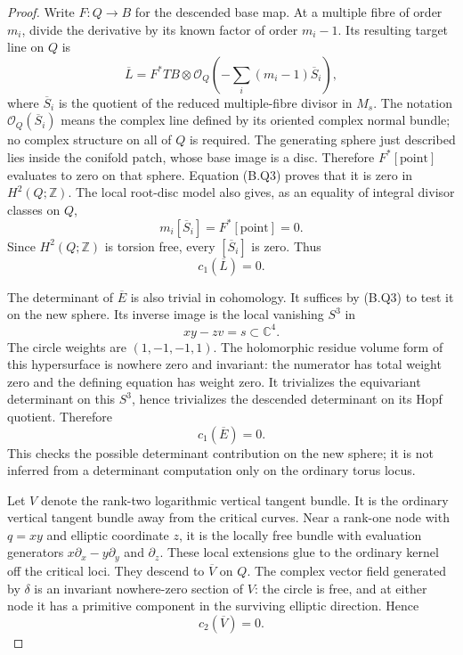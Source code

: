 \begin{proof}
Write $F:Q\to B$ for the descended base map.  At a multiple
fibre of order $m_i$, divide the derivative by its known
factor of order $m_i-1$.  Its resulting target line on $Q$
is
\[
 \overline L=F^*TB\otimes
        \mathcal O_Q\!\left(-\sum_i(m_i-1)\overline S_i\right),
 \tag{B.Q5}
\]
where $\overline S_i$ is the quotient of the reduced
multiple-fibre divisor in $M_s$.  The notation
$\mathcal O_Q(\overline S_i)$ means the complex line defined
by its oriented complex normal bundle; no complex structure
on all of $Q$ is required.
The generating sphere just described lies inside the
conifold patch, whose base image is a disc.  Therefore
$F^*[\mathrm{point}]$ evaluates to zero on that sphere.
Equation (B.Q3) proves that it is zero in $H^2(Q;\mathbb Z)$.
The local root-disc model also gives, as an equality of
integral divisor classes on $Q$,
\[
 m_i[\overline S_i]=F^*[\mathrm{point}]=0.
\]
Since $H^2(Q;\mathbb Z)$ is torsion free, every
$[\overline S_i]$ is zero.  Thus
\[
                         c_1(\overline L)=0.
 \tag{B.Q6}
\]

The determinant of $\overline E$ is also trivial in
cohomology.  It suffices by (B.Q3) to test it on the new
sphere.  Its inverse image is the local vanishing $S^3$ in
\[
                         xy-zv=s\subset\mathbb C^4.
\]
The circle weights are $(1,-1,-1,1)$.  The holomorphic
residue volume form of this hypersurface is nowhere zero
and invariant: the numerator has total weight zero and
the defining equation has weight zero.  It trivializes the
equivariant determinant on this $S^3$, hence trivializes
the descended determinant on its Hopf quotient.  Therefore
\[
                         c_1(\overline E)=0.
 \tag{B.Q7}
\]
This checks the possible determinant contribution on the
new sphere; it is not inferred from a determinant computation
only on the ordinary torus locus.

Let $V$ denote the rank-two logarithmic vertical tangent
bundle.  It is the ordinary vertical tangent bundle away
from the critical curves.  Near a rank-one node with
$q=xy$ and elliptic coordinate $z$, it is the locally free
bundle with evaluation generators
$x\partial_x-y\partial_y$ and $\partial_z$.
These local extensions glue to the ordinary kernel off
the critical loci.  They descend to $\overline V$ on $Q$.
The complex vector field generated by $\delta$ is an
invariant nowhere-zero section of $V$: the circle is free,
and at either node it has a primitive component in the
surviving elliptic direction.  Hence
\[
                         c_2(\overline V)=0.
 \tag{B.Q8}
\]


\end{proof}
